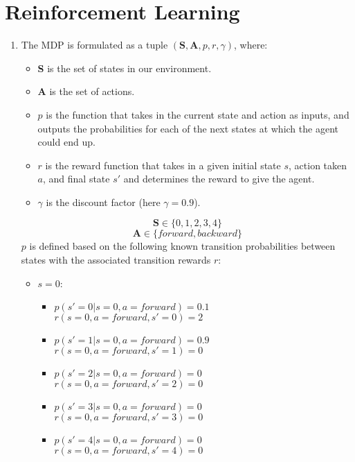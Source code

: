 \documentclass[english]{article}
\begin{document}
\section{Reinforcement Learning}
\begin{enumerate}
\item The MDP is formulated as a tuple $(\mathbf{S}, \mathbf{A}, p, r, \gamma)$, where: 
\begin{itemize}
\item \textbf{S} is the set of states in our environment. 
\item \textbf{A} is the set of actions. 
\item $p$ is the function that takes in the current state and action as inputs, and outputs the probabilities for each of the next states at which the agent could end up. 
\item $r$ is the reward function that takes in a given initial state $s$, action taken $a$, and final state $s'$ and determines the reward to give the agent.
\item $\gamma$ is the discount factor (here $\gamma = 0.9$).
\end{itemize}
$$\mathbf{S} \in \{0,1,2,3,4\}$$
$$\mathbf{A} \in \{forward, backward\}$$
$p$ is defined based on the following known transition probabilities between states with the associated transition rewards $r$:

\begin{itemize}

\item $s = 0$: 
\begin{itemize}
\item $p(s' = 0 | s = 0, a = forward) = 0.1$   \\ 
$r(s = 0, a = forward, s' = 0) = 2$  
\item $p(s' = 1 | s = 0, a = forward) = 0.9$ \\ 
$r(s = 0, a = forward, s' = 1) = 0$
\item $p(s' = 2 | s = 0, a = forward) = 0$ \\ 
$r(s = 0, a = forward, s' = 2) = 0$
\item $p(s' = 3 | s = 0, a = forward) = 0$ \\ 
$r(s = 0, a = forward, s' = 3) = 0$
\item $p(s' = 4 | s = 0, a = forward) = 0$ \\
$r(s = 0, a = forward, s' = 4) = 0$


\end{itemize}
\end{itemize}
\end{enumerate}
\end{document}
